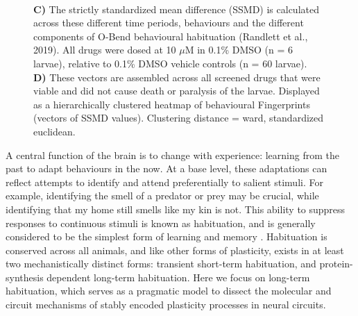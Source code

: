 \documentclass[9pt,lineno]{RandlettLab_elife}
\begin{document}
\begin{figure}
\begin{fullwidth}
\begin{center}
{\\ \textbf{C)} The strictly standardized mean difference (SSMD) is calculated across these different time periods, behaviours and the different components of O-Bend behavioural habituation (Randlett et al., 2019). All drugs were dosed at 10 $\mu$M in 0.1\% DMSO (n = 6 larvae), relative to 0.1\% DMSO vehicle controls (n = 60 larvae). 
\\ \textbf{D)} These vectors are assembled across all screened drugs that were viable and did not cause death or paralysis of the larvae. Displayed as a hierarchically clustered heatmap of behavioural Fingerprints (vectors of SSMD values). Clustering distance = ward, standardized euclidean. }
\label{fig:1}
\label{table:1}
\label{table:2}

\end{center}
\end{fullwidth}
\end{figure}

A central function of the brain is to change with experience: learning from the past to adapt behaviours in the now. At a base level, these adaptations can reflect attempts to identify and attend preferentially to salient stimuli. For example, identifying the smell of a predator or prey may be crucial, while identifying that my home still smells like my kin is not. This ability to suppress responses to continuous stimuli is known as habituation, and is generally considered to be the simplest form of learning and memory \cite{Rankin2009-er}. Habituation is conserved across all animals, and like other forms of plasticity, exists in at least two mechanistically distinct forms: transient short-term habituation, and protein-synthesis dependent long-term habituation. Here we focus on long-term habituation, which serves as a pragmatic model to dissect the molecular and circuit mechanisms of stably encoded plasticity processes in neural circuits. 
\end{document}

